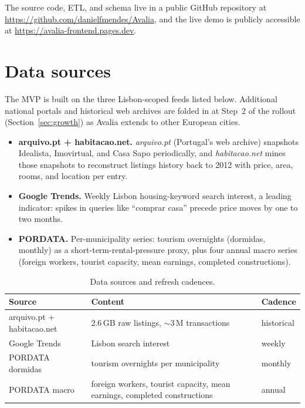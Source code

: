 \documentclass[11pt,a4paper]{article}
\begin{document}
The source code, ETL, and schema live in a public GitHub repository at \url{https://github.com/danielfmendes/Avalia}, and the live demo is publicly accessible at \url{https://avalia-frontend.pages.dev}.

\section{Data sources}\label{sec:data}

The MVP is built on the three Lisbon-scoped feeds listed below. Additional national portals and historical web archives are folded in at Step~2 of the rollout (Section~\ref{sec:growth}) as Avalia extends to other European cities.

\begin{itemize}
  \item \textbf{arquivo.pt + habitacao.net.} \emph{arquivo.pt} (Portugal's web archive) snapshots Idealista, Imovirtual, and Casa Sapo periodically, and \emph{habitacao.net} mines those snapshots to reconstruct listings history back to 2012 with price, area, rooms, and location per entry.
  \item \textbf{Google Trends.} Weekly Lisbon housing-keyword search interest, a leading indicator: spikes in queries like ``comprar casa'' precede price moves by one to two months.
  \item \textbf{PORDATA.} Per-municipality series: tourism overnights (dormidas, monthly) as a short-term-rental-pressure proxy, plus four annual macro series (foreign workers, tourist capacity, mean earnings, completed constructions).
\end{itemize}

\renewcommand{\arraystretch}{1.18}
\begin{table}[H]
\centering
\begin{tabularx}{\linewidth}{@{}lXl@{}}
\toprule
\textbf{Source} & \textbf{Content} & \textbf{Cadence} \\
\midrule
arquivo.pt + habitacao.net & 2.6\,GB raw listings, $\sim$3\,M transactions      & historical \\
Google Trends              & Lisbon search interest                              & weekly     \\
PORDATA dormidas    & tourism overnights per municipality                 & monthly    \\
PORDATA macro              & foreign workers, tourist capacity, mean earnings, completed constructions & annual \\
\bottomrule
\end{tabularx}
\caption{Data sources and refresh cadences.}
\label{tab:sources}
\end{table}
\end{document}
